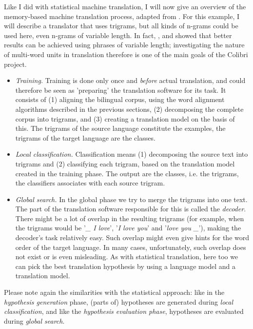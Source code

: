 \documentclass[12pt]{article}
\begin{document}
Like I did with statistical machine translation, I will now give an overview of the memory-based machine translation process, adapted from \citet{vdbb09}. For this example, I will describe a translator that uses trigrams, but all kinds of n-grams could be used here, even n-grams of variable length. In fact, \citet{vangompel09}, \citet{vangompelea09} and \citet{vangompel11} showed that better results can be achieved using phrases of variable length; investigating the nature of multi-word units in translation therefore is one of the main goals of the Colibri project.

\begin{itemize}
\item \emph{Training.} Training is done only once and \emph{before} actual translation, and could therefore be seen as 'preparing' the translation software for its task. It consists of (1) aligning the bilingual corpus, using the word alignment algorithms described in the previous sections, (2) decomposing the complete corpus into trigrams, and (3) creating a translation model on the basis of this. The trigrams of the source language constitute the examples, the trigrams of the target language are the classes.

\item \emph{Local classification.} Classification means (1) decomposing the source text into trigrams and (2) classifying each trigram, based on the translation model created in the training phase. The output are the classes, i.e. the trigrams, the classifiers associates with each source trigram.

\item \emph{Global search.} In the global phase we try to merge the trigrams into one text. The part of the translation software responsible for this is called the \emph{decoder}. There might be a lot of overlap in the resulting trigrams (for example, when the trigrams would be '\emph{\_ I love}', '\emph{I love you}' and '\emph{love you \_}'), making the decoder's task relatively easy. Such overlap might even give hints for the word order of the target language. In many cases, unfortunately, such overlap does not exist or is even misleading. As with statistical translation, here too we can pick the best translation hypothesis by using a language model and a translation model. 

\end{itemize}

Please note again the similarities with the statistical approach: like in the \emph{hypothesis generation} phase, (parts of) hypotheses are generated during \emph{local classification}, and like the \emph{hypothesis evaluation phase}, hypotheses are evaluated during \emph{global search}.
\end{document}

